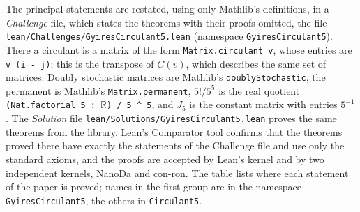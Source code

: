 \documentclass[11pt,a4paper]{article}
\theoremstyle{definition}
\theoremstyle{remark}
\newcommand{\R}{\mathbb{R}}
\begin{document}
The principal statements are restated, using only Mathlib's definitions, in a \emph{Challenge} file, which states the
theorems with their proofs omitted, the file
\texttt{lean/\allowbreak{}Challenges/\allowbreak{}GyiresCirculant5.lean} (namespace \texttt{GyiresCirculant5}). There a circulant is a matrix of
the form \texttt{Matrix.circulant v}, whose entries are \texttt{v (i - j)}; this is the transpose of $C(v)$, which
describes the same set of matrices. Doubly stochastic matrices are Mathlib's \texttt{doublyStochastic}, the permanent is
Mathlib's \texttt{Matrix.permanent}, $5!/5^5$ is the real quotient \texttt{(Nat.factorial 5 :\ $\R$) / 5 \textasciicircum{} 5},
and $J_5$ is the constant matrix with entries $5^{-1}$. The \emph{Solution} file
\texttt{lean/\allowbreak{}Solutions/\allowbreak{}GyiresCirculant5.lean} proves the same theorems from the library. Lean's
Comparator tool confirms that the theorems proved there have exactly the statements of the Challenge file and use only
the standard axioms, and the proofs are accepted by Lean's kernel and by two independent kernels, NanoDa and
con-ron. The table lists where each statement of the paper is
proved; names in the first group are in the namespace \texttt{GyiresCirculant5}, the others in \texttt{Circulant5}.
\end{document}
